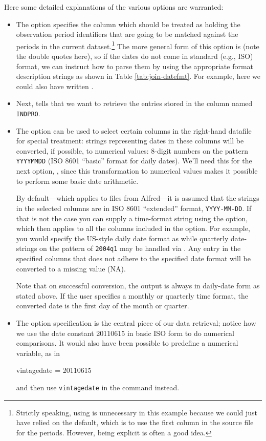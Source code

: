 Here some detailed explanations of the various options are warranted: 
\begin{itemize}
\item The  option specifies the column which should be
  treated as holding the observation period identifiers that are going
  to be matched against the periods in the current 
  dataset.\footnote{Strictly speaking, using  is
    unnecessary in this example because we could just have relied on the
    default, which is to use the first column in the source file for
    the periods. However, being explicit is often a good idea.}  The
  more general form of this option is 
  (note the double quotes here), so if the dates do not come in 
  standard (e.g., ISO) format, we can instruct  how to
  parse them by using the appropriate format description strings as
  shown in Table \ref{tab:join-datefmt}.  For example, here we could
  also have written .
\item Next,  tells  that we want to
  retrieve the entries stored in the column named \texttt{INDPRO}.
\item The  option can be used to select certain
  columns in the right-hand datafile for special treatment: strings
  representing dates in these columns will be converted, if possible,
  to numerical values: 8-digit numbers on the pattern
  \texttt{YYYYMMDD} (ISO 8601 ``basic'' format for daily dates). We'll
  need this for the next option, , since this
  transformation to numerical values makes it possible to perform some
  basic date arithmetic.

  By default---which applies to files from Alfred---it is assumed that
  the strings in the selected columns are in ISO 8601 ``extended''
  format, \texttt{YYYY-MM-DD}. If that is not the case you can supply
  a time-format string using the  option, which
  then applies to all the columns included in the 
  option. For example, you would specify the US-style daily date
  format as  while quarterly
  date-strings on the pattern of \texttt{2004q1} may be handled via
  . Any entry in the specified columns
  that does not adhere to the specified date format will be converted
  to a missing value (NA).

  Note that on successful conversion, the output is always in
  daily-date form as stated above. If the user specifies a monthly or
  quarterly time format, the converted date is the first day of the
  month or quarter.
\item The  option specification is the central piece of
  our data retrieval; notice how we use the date constant 20110615 in
  basic ISO form to do numerical comparisons. It would also have been
  possible to predefine a numerical variable, as in
 \begin{code}
   vintagedate = 20110615
 \end{code}
 and then use \texttt{vintagedate} in the  command instead.


\end{itemize}

